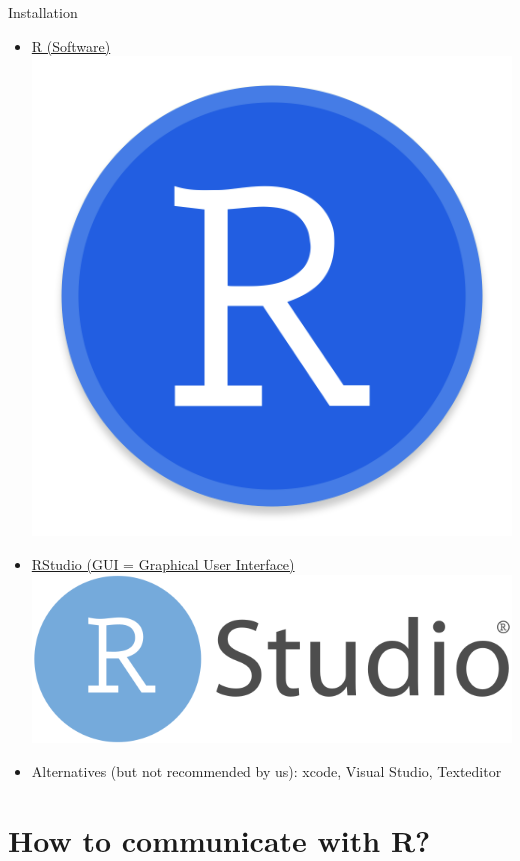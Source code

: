 \documentclass[xcolor=dvipsnames, aspectratio = 169]{beamer}
\begin{document}
\begin{frame}{Installation}
	\begin{itemize}
		\item \href{https://www.r-project.org/}{R (Software)  \includegraphics[scale=0.01]{include/r-logo}}
		\item \href{https://www.rstudio.com/}{RStudio (GUI = Graphical User Interface)  \includegraphics[scale=0.04]{include/rstudio-logo}}
		\item Alternatives (but not recommended by us): xcode, Visual Studio, Texteditor
	\end{itemize}
	
\end{frame}

\section{How to communicate with R?}
\end{document}
